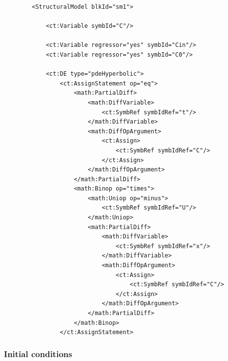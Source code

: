 \lstset{language=XML}
\begin{lstlisting}
        <StructuralModel blkId="sm1">
             
            <ct:Variable symbId="C"/>
            
            <ct:Variable regressor="yes" symbId="Cin"/>
            <ct:Variable regressor="yes" symbId="C0"/>
            
            <ct:DE type="pdeHyperbolic">
                <ct:AssignStatement op="eq">
                    <math:PartialDiff>
                        <math:DiffVariable>
                            <ct:SymbRef symbIdRef="t"/>
                        </math:DiffVariable>
                        <math:DiffOpArgument>
                            <ct:Assign>
                                <ct:SymbRef symbIdRef="C"/>
                            </ct:Assign>
                        </math:DiffOpArgument>
                    </math:PartialDiff>
                    <math:Binop op="times">
                        <math:Uniop op="minus">
                            <ct:SymbRef symbIdRef="U"/>
                        </math:Uniop>
                        <math:PartialDiff>
                            <math:DiffVariable>
                                <ct:SymbRef symbIdRef="x"/>
                            </math:DiffVariable>
                            <math:DiffOpArgument>
                                <ct:Assign>
                                    <ct:SymbRef symbIdRef="C"/>
                                </ct:Assign>
                            </math:DiffOpArgument>
                        </math:PartialDiff>
                    </math:Binop>
                </ct:AssignStatement>
\end{lstlisting}

\subsubsection*{Initial conditions}

